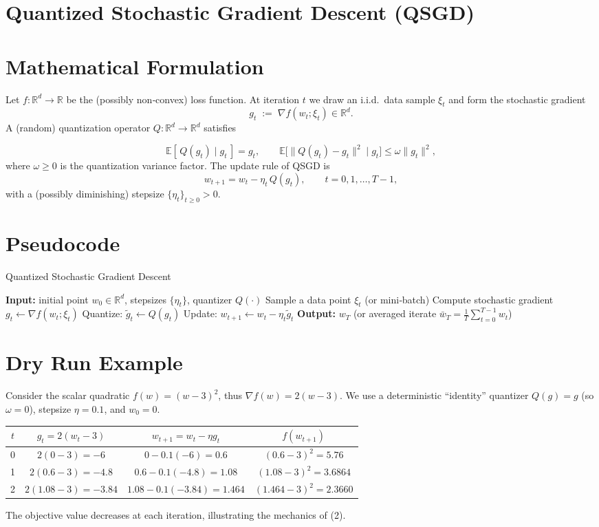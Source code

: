 \documentclass{article}
\newcommand{\EE}{\mathbb{E}}
\newcommand{\RR}{\mathbb{R}}
\begin{document}
\section*{Quantized Stochastic Gradient Descent (QSGD)}

\section*{Mathematical Formulation}
Let $f:\RR^{d}\rightarrow\RR$ be the (possibly non‑convex) loss function.  
At iteration $t$ we draw an i.i.d.\ data sample $\xi_{t}$ and form the stochastic gradient
\[
g_{t}\;:=\;\nabla f(w_{t};\xi_{t})\in\RR^{d}.
\]
A (random) quantization operator $Q:\RR^{d}\rightarrow\RR^{d}$ satisfies  

\[
\EE[\,Q(g_{t})\mid g_{t}\,]=g_{t},\qquad
\EE\!\big[\|Q(g_{t})-g_{t}\|^{2}\mid g_{t}\big]\leq \omega\|g_{t}\|^{2},
\tag{1}
\]
where $\omega\ge 0$ is the quantization variance factor.  
The update rule of QSGD is
\[
w_{t+1}=w_{t}-\eta_{t}\,Q(g_{t}),\qquad t=0,1,\dots,T-1,
\tag{2}
\]
with a (possibly diminishing) stepsize $\{\eta_{t}\}_{t\ge0}>0$.

\section*{Pseudocode}
\begin{algorithm}[H]
\caption{Quantized Stochastic Gradient Descent}
\begin{algorithmic}[1]
\State \textbf{Input:} initial point $w_{0}\in\RR^{d}$, stepsizes $\{\eta_{t}\}$, quantizer $Q(\cdot)$
    \State Sample a data point $\xi_{t}$ (or mini‑batch)
    \State Compute stochastic gradient $g_{t}\gets\nabla f(w_{t};\xi_{t})$
    \State Quantize: $\tilde g_{t}\gets Q(g_{t})$
    \State Update: $w_{t+1}\gets w_{t}-\eta_{t}\tilde g_{t}$
\EndFor
\State \textbf{Output:} $w_{T}$ (or averaged iterate $\bar w_{T}=\frac{1}{T}\sum_{t=0}^{T-1}w_{t}$)
\end{algorithmic}
\end{algorithm}

\section*{Dry Run Example}
Consider the scalar quadratic $f(w)=(w-3)^{2}$, thus $\nabla f(w)=2(w-3)$.  
We use a deterministic “identity” quantizer $Q(g)=g$ (so $\omega=0$), stepsize $\eta=0.1$, and $w_{0}=0$.

\begin{center}
\begin{tabular}{c|c|c|c}
$t$ & $g_{t}=2(w_{t}-3)$ & $w_{t+1}=w_{t}-\eta g_{t}$ & $f(w_{t+1})$\\\hline
0 & $2(0-3)=-6$ & $0-0.1(-6)=0.6$ & $(0.6-3)^{2}=5.76$\\
1 & $2(0.6-3)=-4.8$ & $0.6-0.1(-4.8)=1.08$ & $(1.08-3)^{2}=3.6864$\\
2 & $2(1.08-3)=-3.84$ & $1.08-0.1(-3.84)=1.464$ & $(1.464-3)^{2}=2.3660$
\end{tabular}
\end{center}
The objective value decreases at each iteration, illustrating the mechanics of (2).
\end{document}
